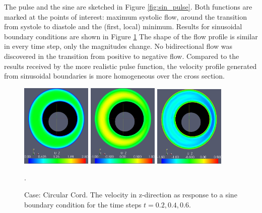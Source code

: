 The pulse and the sine are sketched in Figure \ref{fig:sin_pulse}. Both functions are marked at the points of interest: maximum systolic flow, around the transition from systole to diastole and the (first, local) minimum. Results for sinusoidal boundary conditions are shown in Figure \ref{fig:case2} The shape of the flow profile is similar in every time step, only the magnitudes change. No bidirectional flow was discovered in the transition from positive to negative flow. Compared to the results received by the more realistic pulse function, the velocity profile generated from sinusoidal boundaries is more homogeneous over the cross section. 




\begin{figure}\begin{center}
\includegraphics[width=0.3\textwidth]{chapters/haughton/eps_images/sin_sysmax_nmb2.eps}
\includegraphics[width=0.3\textwidth]{chapters/haughton/eps_images/sin_sysdia_nmb4.eps}
\includegraphics[width=0.3\textwidth]{chapters/haughton/eps_images/sin_diamin_nmb6.eps}
\caption{Case: Circular Cord. The velocity in z-direction as response to a sine boundary condition for the time steps $t=0.2, 0.4, 0.6$.}
\label{fig:case2}. 
\end{center}\end{figure}





